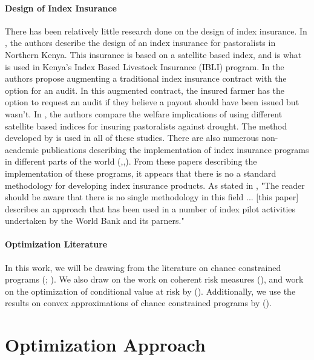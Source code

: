 \documentclass[11pt]{article}
\begin{document}
\paragraph{Design of Index Insurance} There has been relatively little research done on the design of index insurance. In \cite{chantarat2013designing}, the authors describe the design of an index insurance for pastoralists in Northern Kenya. This insurance is based on a satellite based index, and is what is used in Kenya's Index Based Livestock Insurance (IBLI) program. In \cite{flatnes2018improving} the authors propose augmenting a traditional index insurance contract with the option for an audit. In this augmented contract, the insured farmer has the option to request an audit if they believe a payout should have been issued but wasn't. In \cite{jensen2019does}, the authors compare the welfare implications of using different satellite based indices for insuring pastoralists against drought. The method developed by \cite{chantarat2013designing} is used in all of these studies. There are also numerous non-academic publications describing the implementation of index insurance programs in different parts of the world (\cite{osgood2007designing},\cite{world2011weather},\cite{greatrex2015scaling}). From these papers describing the implementation of these programs, it appears that there is no a standard methodology for developing index insurance products. As stated in \cite{world2011weather}, "The reader should be aware that there is no single methodology in this field ... [this paper] describes an approach that has been used in a number of index pilot activities undertaken by the World Bank and its parners." 

\paragraph{Optimization Literature} In this work, we will be drawing from the literature on chance constrained programs (\cite{lagoa2005probabilistically}; \cite{charnes1958cost}). We also draw on the work on coherent risk measures (\cite{artzner1999coherent}), and work on the optimization of conditional value at risk by (\cite{rockafellar2000optimization}). Additionally, we use the results on convex approximations of chance constrained programs by (\cite{nemirovski2007convex}). 

\section{Optimization Approach}
\end{document}
